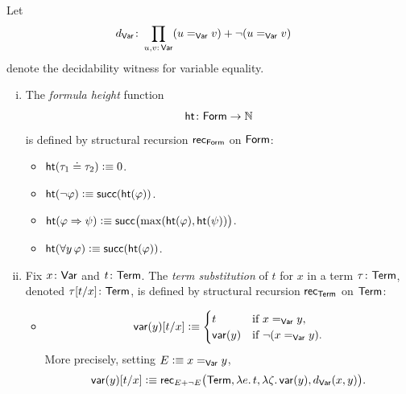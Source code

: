 \begin{defns}\label{defn:ht-ren}
    Let
    \begin{align*}
        d_{\fun{Var}}&\colon
            \prod_{u,v\colon\fun{Var}}
                (u\eq{\fun{Var}}v)+\neg(u\eq{\fun{Var}}v)
    \end{align*}
    denote the decidability witness for variable equality.
    \begin{enumerate}[i),font=\upshape]
        \item The \textsl{formula height} function
        \[
            \fun{ht}\colon\fun{Form}\to\N
        \]
        is defined by structural recursion $\mathsf{rec}_{\mathsf{Form}}$ on $\mathsf{Form}$:
        \begin{itemize}
            \item $\mathsf{ht}(\tau_1\doteq\tau_2)\mathrel{\vcentcolon}\equiv 0$.
            
            \item $\mathsf{ht}(\neg\varphi)\mathrel{\vcentcolon}\equiv\mathsf{succ}(\mathsf{ht}(\varphi))$.
            
            \item $\mathsf{ht}(\varphi\mathrel{\Rightarrow}\psi)\mathrel{\vcentcolon}\equiv\mathsf{succ}\bigl(\max(\mathsf{ht}(\varphi),\mathsf{ht}(\psi))\bigr)$.
            
            \item $\mathsf{ht}(\forall y\,\varphi)\mathrel{\vcentcolon}\equiv\mathsf{succ}(\mathsf{ht}(\varphi))$.
            \end{itemize}
            
            \item Fix $x\colon\fun{Var}$ and $t\colon\fun{Term}$. The \textsl{term substitution} of $t$ for $x$ in a term $\tau\colon\fun{Term}$, denoted $\tau[t/x]\colon\fun{Term}$, is defined by structural recursion $\mathsf{rec}_{\mathsf{Term}}$ on $\mathsf{Term}$:
        \begin{itemize}
        \item
        \[
            \mathsf{var}(y)[t/x]\mathrel{\vcentcolon}\equiv
            \begin{cases}
                t
                    &\text{if }x\mathrel{=_{\mathsf{Var}}}y,\\
                \mathsf{var}(y)
                    &\text{if }\neg(x\mathrel{=_{\mathsf{Var}}}y).
            \end{cases}
        \]
        More precisely, setting $E\mathrel{\vcentcolon}\equiv x\mathrel{=_{\mathsf{Var}}}y$,
        \[
            \mathsf{var}(y)[t/x]\mathrel{\vcentcolon}\equiv\mathsf{rec}_{E+\neg E}\bigl(
                \mathsf{Term},
                \lambda e.\,t,
                \lambda\zeta.\,\mathsf{var}(y),
                d_{\mathsf{Var}}(x,y)
            \bigr).
        \]
        

\end{itemize}
\end{enumerate}
\end{defns}
